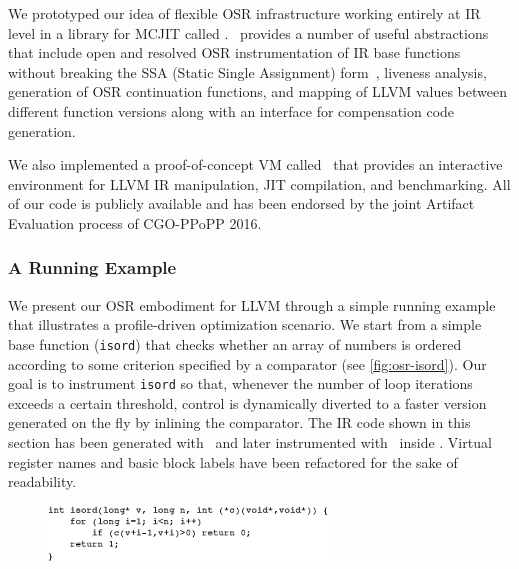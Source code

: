 


We prototyped our idea of flexible OSR infrastructure working entirely at IR level in a library for MCJIT called \osrkit. \osrkit\ provides a number of useful abstractions that include open and resolved OSR instrumentation of IR base functions without breaking the SSA (Static Single Assignment) form~\cite{Cytron91}, liveness analysis, generation of OSR continuation functions, and mapping of LLVM values between different function versions along with an interface for compensation code generation.

We also implemented a proof-of-concept VM called \tinyvm\ that provides an interactive environment for LLVM IR manipulation, JIT compilation, and benchmarking. All of our code is publicly available and has been endorsed by the joint Artifact Evaluation process of CGO-PPoPP 2016.

\subsubsection*{A Running Example}
We present our OSR embodiment for LLVM through a simple running example that illustrates a profile-driven optimization scenario. We start from a simple base function ({\tt isord}) that checks whether an array of numbers is ordered according to some criterion specified by a comparator (see \myfigure\ref{fig:osr-isord}). Our goal is to instrument {\tt isord} so that, whenever the number of loop iterations exceeds a certain threshold, control is dynamically diverted to a faster version generated on the fly by inlining the comparator. The IR code shown in this section has been generated with \clang\ and later instrumented with \osrkit\ inside \tinyvm. Virtual register names and basic block labels have been refactored for the sake of readability.

\ifdefined\noauthorea
\begin{figure}[t]
\begin{center}
\includegraphics[width=0.66\textwidth]{figures/osr-isord/osr-isord.eps}
\caption{\protect}
\end{center}
\end{figure}
\fi

